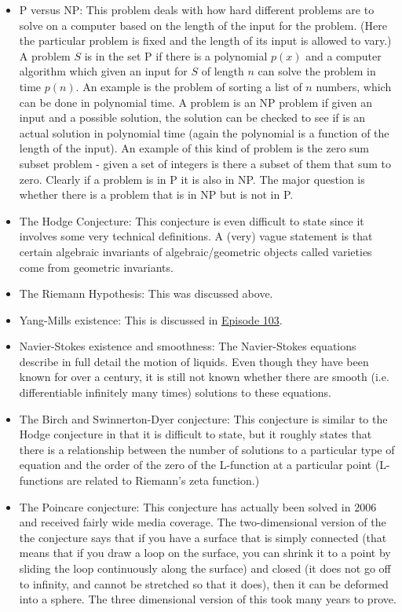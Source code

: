 \begin{itemize}
\item P versus NP: This problem deals with how hard different problems are to solve on a computer based on the length of the input for the problem. (Here the particular problem is fixed and the length of its input is allowed to vary.) A problem $S$ is in the set P if there is a polynomial $p(x)$ and a computer algorithm which given an input for $S$ of length $n$ can solve the problem in time $p(n)$. An example is the problem of sorting a list of $n$ numbers, which can be done in polynomial time. A problem is an NP problem if given an input and a possible solution, the solution can be checked to see if is an actual solution in polynomial time (again the polynomial is a function of the length of the input). An example of this kind of problem is the zero sum subset problem - given a set of integers is there a subset of them that sum to zero. Clearly if a problem is in P it is also in NP. The major question is whether there is a problem that is in NP but is not in P.

\item The Hodge Conjecture: This conjecture is even difficult to state since it involves some very technical definitions. A (very) vague statement is that certain algebraic invariants of algebraic/geometric objects called varieties come from geometric invariants.

\item The Riemann Hypothesis: This was discussed above.

\item Yang-Mills existence: This is discussed in \hyperref[ep103]{Episode 103}.

\item Navier-Stokes existence and smoothness: The Navier-Stokes equations describe in full detail the motion of liquids. Even though they have been known for over a century, it is still not known whether there are smooth (i.e. differentiable infinitely many times) solutions to these equations.

\item The Birch and Swinnerton-Dyer conjecture: This conjecture is similar to the Hodge conjecture in that it is difficult to state, but it roughly states that there is a relationship between the number of solutions to a particular type of equation and the order of the zero of the L-function at a particular point (L-functions are related to Riemann's zeta function.)

\item The Poincare conjecture: This conjecture has actually been solved in 2006 and received fairly wide media coverage. The two-dimensional version of the the conjecture says that if you have a surface that is simply connected (that means that if you draw a loop on the surface, you can shrink it to a point by sliding the loop continuously along the surface) and closed (it does not go off to infinity, and cannot be stretched so that it does), then it can be deformed into a sphere. The three dimensional version of this took many years to prove.
\end{itemize}


